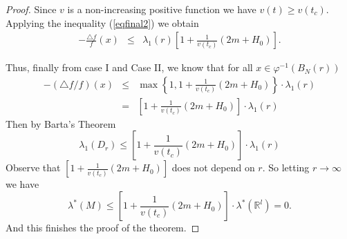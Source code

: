 \documentclass[a4paper]{amsart}
\theoremstyle{definition}
\numberwithin{equation}{section}
\begin{document}
\begin{proof}
 Since $v$ is a non-increasing positive function we have $ v(t) \geq
v(t_c)$. Applying the inequality (\ref{eqfinal2})  we obtain
\begin{eqnarray}\label{eqfinal3}-\frac{\triangle f}{f}(x)&\leq &\lambda_{1}(r)\left[1+\frac{1}{v(t_c)}\left(2m+H_0\right)\right].
\end{eqnarray} 

Thus, finally from case I and Case II, we know that  for all $x\in \varphi^{-1}(B_{N}(r))$
\begin{eqnarray}
-(\triangle f/f)(x)& \leq&
 \max \left\{ 1, 1+\frac{1}{v(t_c)}\left(2m+H_0\right)\right\}\cdot\lambda_{1}(r)\nonumber \\ &=&
\left[1+\frac{1}{v(t_c)}\left(2m+H_0\right)\right]\cdot\lambda_{1}(r)\nonumber
\end{eqnarray}
Then by Barta's Theorem \[\lambda_{1}(D_r)\leq \left[1+\frac{1}{v(t_c)}\left(2m+H_0\right)\right]\cdot\lambda_{1}(r)\] Observe that $\left[1+\frac{1}{v(t_c)}\left(2m+H_0\right)\right]$ does not depend on $r$. So letting $r\to \infty$ we have 
$$
\lambda^{\ast}(M)\leq \left[1+\frac{1}{v(t_c)}\left(2m+H_0\right)\right]\cdot\lambda^{\ast}({\mathbb{R}}^{l})=0.
$$
And this finishes the proof of the theorem.\end{proof}

   
  
\end{document}
